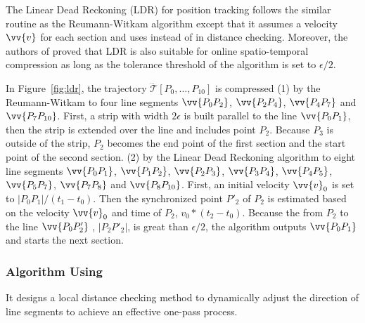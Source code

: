{	{The Linear Dead Reckoning (LDR)\cite{Lange:Tracking} for position tracking follows the similar routine as the Reumann-Witkam algorithm except that it assumes a velocity ${\vv{v}}$ for each section and uses \sed instead of \ped in distance checking.
		Moreover, the authors of \cite{Trajcevski:DDR} proved that LDR is also suitable for online spatio-temporal compression as long as the tolerance threshold of the algorithm is set to $\epsilon/2$.}
	
	\begin{example}
		\label{exm-alg-strip}
		In Figure~\ref{fig:ldr}, the trajectory $\dddot{\mathcal{T}}[P_0, \ldots, P_{10}]$ is compressed
		(1) by the Reumann-Witkam to four line segments $\vv{P_0P_2}$, $\vv{P_2P_4}$, $\vv{P_4P_7}$ and $\vv{P_7P_{10}}$. First, a strip with width $2\epsilon$ is built parallel to the line $\vv{P_0P_1}$, then the strip is extended over the line and includes point $P_2$. Because $P_3$ is outside of the strip, $P_2$ becomes the end point of the first section and the start point of the second section.
		(2) by the Linear Dead Reckoning algorithm to eight line segments $\vv{P_0P_1}$, $\vv{P_1P_2}$, $\vv{P_2P_3}$, $\vv{P_3P_4}$, $\vv{P_4P_5}$, $\vv{P_5P_7}$, $\vv{P_7P_8}$ and $\vv{P_8P_{10}}$. First, an initial velocity ${\vv{v}_0}$ is set to $|P_0P_1|/(t_1-t_0)$. Then the synchronized point $P'_2$ of $P_2$ is estimated based on the velocity ${\vv{v}_0}$ and time of $P_2$, \ie ${v}_0 * (t_2-t_0)$. Because the \sed from $P_2$ to the line $\vv{P_0P'_2}$ , \ie $|P_2P'_2|$, is great than $\epsilon/2$, the algorithm outputs $\vv{P_0P_1}$ and starts the next section.
	\end{example}
	
}%


\subsubsection{{Algorithm \operb Using \ped} \cite{Lin:Operb}}
It designs a local distance checking method to dynamically adjust the direction of line segments to achieve an effective one-pass process.

